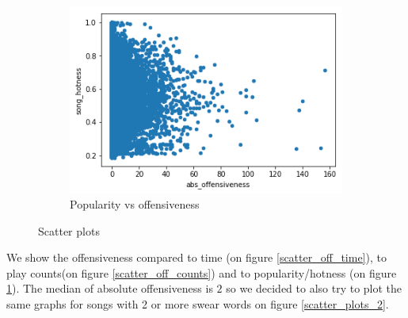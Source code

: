 \documentclass[11pt]{article}
\begin{document}
\begin{figure}
\begin{subfigure}[b]{0.45\textwidth}
\includegraphics[width=\textwidth]{plots/scatter_off_hotness}
\caption{Popularity vs offensiveness}
\label{scatter_off_hotness}
\end{subfigure}
\caption{Scatter plots}
\label{scatter_plots}
\end{figure}

We show the offensiveness compared to time (on figure \ref{scatter_off_time}), to play counts(on figure \ref{scatter_off_counts}) and to popularity/hotness (on figure \ref{scatter_off_hotness}). The median of absolute offensiveness is $2$ so we decided to also try to plot the same graphs for songs with 2 or more swear words on figure \ref{scatter_plots_2}. 
\end{document}
